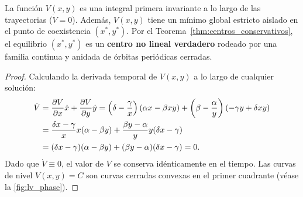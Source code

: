 \begin{theorem}
La función $V(x,y)$ es una integral primera invariante a lo largo de las trayectorias ($\dot{V} = 0$). Además, $V(x,y)$ tiene un mínimo global estricto aislado en el punto de coexistencia $(x^*, y^*)$. Por el Teorema~\ref{thm:centros_conservativos}, el equilibrio $(x^*, y^*)$ es un \textbf{centro no lineal verdadero} rodeado por una familia continua y anidada de órbitas periódicas cerradas.
\end{theorem}

\begin{proof}
Calculando la derivada temporal de $V(x,y)$ a lo largo de cualquier solución:
\begin{align}
    \dot{V} &= \frac{\partial V}{\partial x}\dot{x} + \frac{\partial V}{\partial y}\dot{y} = \left(\delta - \frac{\gamma}{x}\right)(\alpha x - \beta x y) + \left(\beta - \frac{\alpha}{y}\right)(-\gamma y + \delta x y) \notag\\
    &= \frac{\delta x - \gamma}{x} x (\alpha - \beta y) + \frac{\beta y - \alpha}{y} y (\delta x - \gamma) \notag\\
    &= (\delta x - \gamma)(\alpha - \beta y) + (\beta y - \alpha)(\delta x - \gamma) = 0.
\end{align}
Dado que $\dot{V} \equiv 0$, el valor de $V$ se conserva idénticamente en el tiempo. Las curvas de nivel $V(x,y) = C$ son curvas cerradas convexas en el primer cuadrante (véase la \cref{fig:lv_phase}).
\end{proof}

